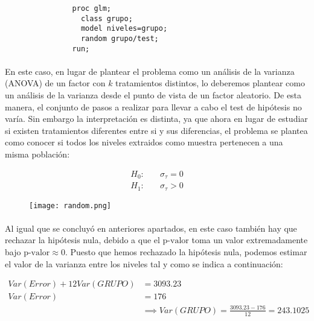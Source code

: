 \documentclass{article}
\begin{document}
      \begin{figure}[h]
        \centering
        \begin{verbatim}
          proc glm;
            class grupo;
            model niveles=grupo;
            random grupo/test;
          run;
        \end{verbatim}
        \label{code:sas_8}
      \end{figure}

      \paragraph{}
      En este caso, en lugar de plantear el problema como un análisis de la varianza (ANOVA) de un factor con $k$ tratamientos distintos, lo deberemos plantear como un análisis de la varianza desde el punto de vista de un factor aleatorio. De esta manera, el conjunto de pasos a realizar para llevar a cabo el test de hipótesis no varía. Sin embargo la interpretación es distinta, ya que ahora en lugar de estudiar si existen tratamientos diferentes entre si y sus diferencias, el problema se plantea como conocer si todos los niveles extraidos como muestra pertenecen a una misma población:

      \begin{align*}
        H_0:&\quad \sigma_\tau = 0 \\
        H_1:&\quad \sigma_\tau > 0
      \end{align*}

      \begin{figure}[H]
        \centering
        \texttt{[image: random.png]}
      \end{figure}

      \paragraph{}
      Al igual que se concluyó en anteriores apartados, en este caso también hay que rechazar la hipótesis nula, debido a que el $\text{p-valor}$ toma un valor extremadamente bajo $\text{p-valor}\approx 0$. Puesto que hemos rechazado la hipótesis nula, podemos estimar el valor de la varianza entre los niveles tal y como se indica a continuación:

      \begin{align*}
        Var(Error) + 12 Var(GRUPO) &= 3093.23\\
        Var(Error) &= 176 \\
        &\implies Var(GRUPO) = \frac{3093.23 - 176}{12} = 243.1025
      \end{align*}
\end{document}
